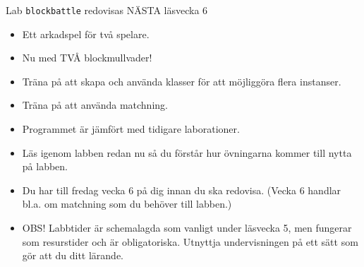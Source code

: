\begin{SlideExtra}{Lab \texttt{blockbattle} redovisas NÄSTA läsvecka 6}
\begin{minipage}{0.59\textwidth}
    \begin{itemize}\SlideFontTiny
      \item Ett arkadspel för två spelare.
      \item Nu med TVÅ blockmullvader!
      \item Träna på att skapa och använda klasser för att möjliggöra flera instanser.
      \item Träna på att använda matchning.
      \item Programmet är  jämfört med tidigare laborationer.
      \item Läs igenom labben redan nu så du förstår hur övningarna kommer till nytta på labben.
      \item Du har till fredag vecka 6 på dig innan du ska redovisa. (Vecka 6 handlar bl.a. om matchning som du behöver till labben.)
      \item OBS! Labbtider är schemalagda som vanligt under läsvecka 5, men fungerar som resurstider och är  obligatoriska. Utnyttja undervisningen på ett sätt som gör att du  ditt lärande.  
    \end{itemize}    
  \end{minipage}
\end{SlideExtra}
  
\fi
